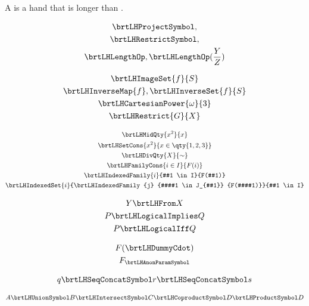\documentclass{article}
\begin{document}
    A  is a hand that is longer than
    .

    \begin{gather}
        \brtLHProjectSymbol ,
        \\
        \brtLHRestrictSymbol ,
        \\
        \brtLHLengthOp ,
        \brtLHLengthOp(\frac Y Z)
    \end{gather}

    \begin{gather}
        \brtLHImageSet {f} {S}
        \\
        \brtLHInverseMap {f} ,
        \brtLHInverseSet {f} {S}
        \\
        \brtLHCartesianPower {\omega} {3}
        \\
        \brtLHRestrict {G} {X}
    \end{gather}

    \begin{gather}
        \brtLHMidQty {x^2} {x}
        \\
        \brtLHSetCons {x^2} {x \in \qty{1,2,3}}
        \\
        \brtLHDivQty {X} {\sim}
        \\
        \brtLHFamilyCons {i \in I} {F(i)}
        \\
        \brtLHIndexedFamily {i} {#1 \in I} {F(#1)}
        \\
        \brtLHIndexedSet {i}
            {\brtLHIndexedFamily {j} {##1 \in J_{#1}} {F(##1)}}
            {#1 \in I}
    \end{gather}

    \begin{gather}
        Y \brtLHFrom X
        \\
        P \brtLHLogicalImplies Q
        \\
        P \brtLHLogicalIff Q
    \end{gather}

    \begin{gather}
        F(\brtLHDummyCdot)
        \\
        F_{\brtLHAnonParamSymbol}
    \end{gather}

    \begin{gather}
        q
        \brtLHSeqConcatSymbol
        r
        \brtLHSeqConcatSymbol
        s
    \end{gather}

    \begin{gather}
        A
        \brtLHUnionSymbol B
        \brtLHIntersectSymbol C
        \brtLHCoproductSymbol D
        \brtLHProductSymbol D
    \end{gather}
\end{document}
